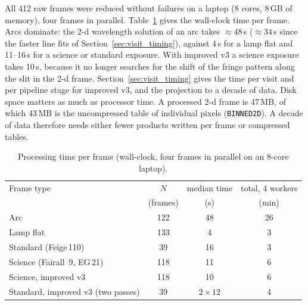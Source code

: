 All 412 raw frames were reduced without failures on a laptop (8 cores, 8\,GB of memory), four frames in parallel.
Table~\ref{tab:timing} gives the wall-clock time per frame. Arcs dominate: the 2-d wavelength solution of an arc takes
$\approx48$\,s ($\approx34$\,s since the faster line fits of Section~\ref{sec:visit_timing}), against 4\,s for a lamp flat and 11--16\,s for a science or standard exposure. With improved v3 a
science exposure takes 10\,s, because it no longer searches for the shift of the fringe pattern along the slit in the
2-d frame. Section~\ref{sec:visit_timing} gives the time per visit and per pipeline stage for improved v3, and the
projection to a decade of data.
Disk space matters as much as processor time. A processed 2-d frame is 47\,MB, of which 43\,MB is the uncompressed
table of individual pixels (\texttt{BINNED2D}). A decade of data therefore needs either fewer products written per
frame or compressed tables.

\begin{table}[!htbp]
\centering
\caption{Processing time per frame (wall-clock, four frames in parallel on an 8-core laptop).}
\label{tab:timing}
\begin{tabular}{lccc}
\toprule
Frame type & $N$ & median time & total, 4 workers \\
 & (frames) & (s) & (min) \\
\midrule
Arc & 122 & 48 & 26 \\
Lamp flat & 133 & 4 & 3 \\
Standard (Feige\,110) & 39 & 16 & 3 \\
Science (Fairall~9, EG\,21) & 118 & 11 & 6 \\
Science, improved v3 & 118 & 10 & 6 \\
Standard, improved v3 (two passes) & 39 & $2\times12$ & 4 \\
\bottomrule
\end{tabular}
\end{table}
